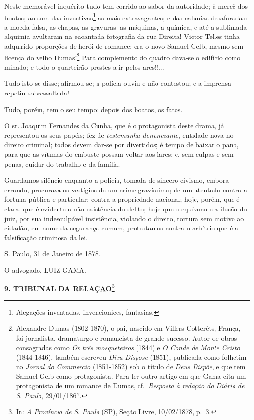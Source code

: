 Neste memorável inquérito tudo tem corrido ao sabor da autoridade; à
mercê dos boatos; ao som das inventivas\footnote{Alegações inventadas,
  invencionices, fantasias.} as mais extravagantes; e das calúnias
desaforadas: a moeda falsa, as chapas, as gravuras, as máquinas, a
química, e até a sublimada alquimia avultaram na encantada fotografia da
rua Direita! Victor Telles tinha adquirido proporções de herói de
romance; era o novo Samuel Gelb, mesmo sem licença do velho
Dumas!\footnote{Alexandre Dumas (1802-1870), o pai, nascido em
  Villers-Cotterêts, França, foi jornalista, dramaturgo e romancista de
  grande sucesso. Autor de obras consagradas como \emph{Os três
  mosqueteiros} (1844) e \emph{O Conde de Monte Cristo} (1844-1846),
  também escreveu \emph{Dieu Dispose} (1851), publicada como folhetim no
  \emph{Jornal do Commercio} (1851-1852) sob o título de \emph{Deus
  Dispõe}, e que tem Samuel Gelb como protagonista. Para ler outro
  artigo em que Gama cita um protagonista de um romance de Dumas,
  cf.~\emph{Resposta à redação do Diário de S. Paulo}, 29/01/1867.} Para
complemento do quadro dava-se o edifício como minado; e todo o
quarteirão prestes a ir pelos ares!!...

Tudo isto se disse; afirmou-se; a polícia ouviu e não contestou; e a
imprensa repetiu sobressaltada!...

Tudo, porém, tem o seu tempo; depois dos boatos, os fatos.

O sr. Joaquim Fernandes da Cunha, que é o protagonista deste drama, já
representou os seus papéis; fez de \emph{testemunha denunciante},
entidade nova no direito criminal; todos devem dar-se por divertidos; é
tempo de baixar o pano, para que as vítimas do embuste possam voltar aos
lares; e, sem culpas e sem penas, cuidar do trabalho e da família.

Guardamos silêncio enquanto a polícia, tomada de sincero civismo, embora
errando, procurava os vestígios de um crime gravíssimo; de um atentado
contra a fortuna pública e particular; contra a propriedade nacional;
hoje, porém, que é clara, que é evidente a não existência do delito;
hoje que o equívoco e a ilusão do juiz, por sua indesculpável
insistência, violando o direito, tortura sem motivo ao cidadão, em nome
da segurança comum, protestamos contra o arbítrio que é a falsificação
criminosa da lei.

S. Paulo, 31 de Janeiro de 1878.

O advogado, LUIZ GAMA.

\textbf{9. TRIBUNAL DA RELAÇÃO}\footnote{In: \emph{A Província de S.
  Paulo} (SP), Seção Livre, 10/02/1878, p.~3.}

